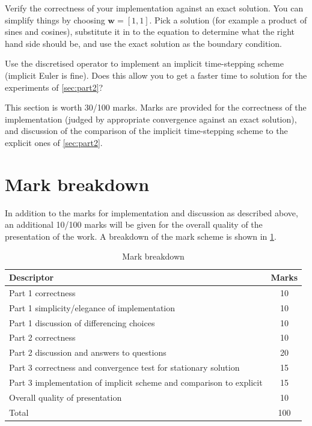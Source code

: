 \documentclass[11pt,a4paper]{article}
\renewcommand{\vec}[1]{\ensuremath{\mathbf{#1}}}
\begin{document}
Verify the correctness of your implementation against an exact
solution. You can simplify things by choosing $\vec{w} = [1, 1]$. Pick
a solution (for example a product of sines and cosines), substitute it
in to the equation to determine what the right hand side should be,
and use the exact solution as the boundary condition.

Use the discretised operator to implement an implicit time-stepping
scheme (implicit Euler is fine). Does this allow you to get a faster
time to solution for the experiments of \cref{sec:part2}?

This section is worth 30/100 marks. Marks are provided for the correctness
of the implementation (judged by appropriate convergence against an
exact solution), and discussion of the comparison of the implicit
time-stepping scheme to the explicit ones of \cref{sec:part2}.

\section*{Mark breakdown}
In addition to the marks for implementation and discussion as
described above, an additional 10/100 marks will be given for the
overall quality of the presentation of the work. A breakdown of the
mark scheme is shown in \cref{tab:marks}.
\begin{table}[htbp]
  \centering
  \renewcommand\tabularxcolumn[1]{m{#1}}
  \begin{tabularx}{0.9\linewidth}{X|c}
    \toprule
    Descriptor & Marks\\
    \midrule
    Part 1 correctness & 10\\
    Part 1 simplicity/elegance of implementation & 10\\
    Part 1 discussion of differencing choices & 10\\
    \midrule
    Part 2 correctness & 10\\
    Part 2 discussion and answers to questions & 20\\
    \midrule
    Part 3 correctness and convergence test for stationary solution & 15\\
    Part 3 implementation of implicit scheme and comparison to
    explicit & 15\\
    \midrule
    Overall quality of presentation & 10\\
    \midrule
    \midrule
    Total & 100\\
    \bottomrule
  \end{tabularx}
  \caption{Mark breakdown}
  \label{tab:marks}
\end{table}
\end{document}
